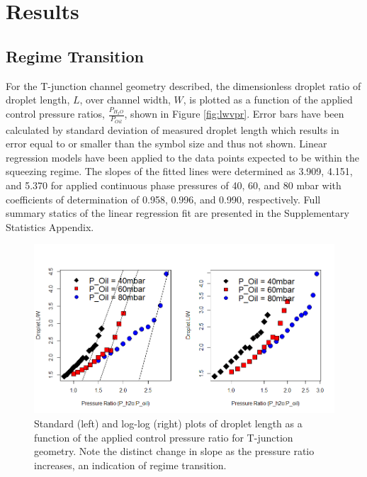 \section{Results}
\label{sec:results}

\subsection{Regime Transition}

For the T-junction channel geometry described, the dimensionless droplet ratio of droplet length, $L$, over channel width, $W$, is plotted as a function of the applied control pressure ratios, $\frac{P_{H_2O}}{P_{Oil}}$, shown in Figure \vref{fig:lwvpr}. Error bars have been calculated by standard deviation of measured droplet length which results in error equal to or smaller than the symbol size and thus not shown. Linear regression models have been applied to the data points expected to be within the squeezing regime. The slopes of the fitted lines were determined as 3.909, 4.151, and 5.370 for applied continuous phase pressures of 40, 60, and 80 mbar with coefficients of determination of 0.958, 0.996, and 0.990, respectively. Full summary statics of the linear regression fit are presented in the Supplementary Statistics Appendix.

\begin{figure}[H]
\centering 
\includegraphics[width=01.0\columnwidth]{lwvpr.PNG} 
\caption[Droplet Length as a Function of Applied Control Pressure Ratio]{Standard (left) and log-log (right) plots of droplet length as a function of the applied control pressure ratio for T-junction geometry. Note the distinct change in slope as the pressure ratio increases, an indication of regime transition.} 
\label{fig:lwvpr} 
\end{figure}

